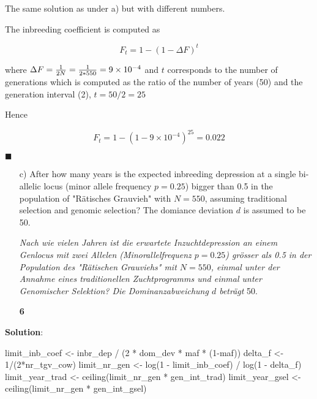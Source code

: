 \documentclass[
]{article}
\newenvironment{Shaded}{\begin{snugshade}}{\end{snugshade}}
\newcommand{\DecValTok}[1]{\textcolor[rgb]{0.00,0.00,0.81}{#1}}
\newcommand{\FunctionTok}[1]{\textcolor[rgb]{0.00,0.00,0.00}{#1}}
\newcommand{\NormalTok}[1]{#1}
\newcommand{\OtherTok}[1]{\textcolor[rgb]{0.56,0.35,0.01}{#1}}
\newcommand{\SpecialCharTok}[1]{\textcolor[rgb]{0.00,0.00,0.00}{#1}}
\newcommand{\points}[1]
{\begin{flushright}\textbf{#1}\end{flushright}}
\newcommand{\solstart}
{\vspace{3ex}\textbf{Solution}:}
\newcommand{\solend}
{\vspace{2ex}$\blacksquare$}
\begin{document}
The same solution as under a) but with different numbers.

The inbreeding coefficient is computed as

\[F_t = 1 - (1 - \Delta F)^t\]

where
\(\Delta F = {1 \over 2N} = {1 \over 2*550} = \ensuremath{9\times 10^{-4}}\)
and \(t\) corresponds to the number of generations which is computed as
the ratio of the number of years (50) and the generation interval (2),
\(t= 50 / 2 = 25\)

Hence

\[F_t =  1 - (1 - \ensuremath{9\times 10^{-4}})^{25} = 0.022\]

\solend

\clearpage
\pagebreak

\begin{enumerate}
\item[c)] After how many years is the expected inbreeding depression at a single bi-allelic locus (minor allele frequency $p=0.25$) bigger than 0.5 in the population of "Rätisches Grauvieh" with $N = 550$, assuming traditional selection and genomic selection? The domiance deviation $d$ is assumed to be 50. 

\textit{Nach wie vielen Jahren ist die erwartete Inzuchtdepression an einem Genlocus mit zwei Allelen (Minorallelfrequenz $p=0.25$) grösser als 0.5 in der Population des "Rätischen Grauviehs" mit $N = 550$, einmal unter der Annahme eines traditionellen Zuchtprogramms und einmal unter Genomischer Selektion? Die Dominanzabweichung $d$ beträgt } 50.
\points{6}
\end{enumerate}

\vspace{3ex}
\solstart

\begin{Shaded}
\begin{Highlighting}[]
\NormalTok{limit\_inb\_coef }\OtherTok{\textless{}{-}}\NormalTok{ inbr\_dep }\SpecialCharTok{/}\NormalTok{ (}\DecValTok{2} \SpecialCharTok{*}\NormalTok{ dom\_dev }\SpecialCharTok{*}\NormalTok{ maf }\SpecialCharTok{*}\NormalTok{ (}\DecValTok{1}\SpecialCharTok{{-}}\NormalTok{maf))}
\NormalTok{delta\_f }\OtherTok{\textless{}{-}} \DecValTok{1}\SpecialCharTok{/}\NormalTok{(}\DecValTok{2}\SpecialCharTok{*}\NormalTok{nr\_tgv\_cow)}
\NormalTok{limit\_nr\_gen }\OtherTok{\textless{}{-}} \FunctionTok{log}\NormalTok{(}\DecValTok{1} \SpecialCharTok{{-}}\NormalTok{ limit\_inb\_coef) }\SpecialCharTok{/} \FunctionTok{log}\NormalTok{(}\DecValTok{1} \SpecialCharTok{{-}}\NormalTok{ delta\_f)}
\NormalTok{limit\_year\_trad }\OtherTok{\textless{}{-}} \FunctionTok{ceiling}\NormalTok{(limit\_nr\_gen }\SpecialCharTok{*}\NormalTok{ gen\_int\_trad)}
\NormalTok{limit\_year\_gsel }\OtherTok{\textless{}{-}} \FunctionTok{ceiling}\NormalTok{(limit\_nr\_gen }\SpecialCharTok{*}\NormalTok{ gen\_int\_gsel)}
\end{Highlighting}
\end{Shaded}
\end{document}
